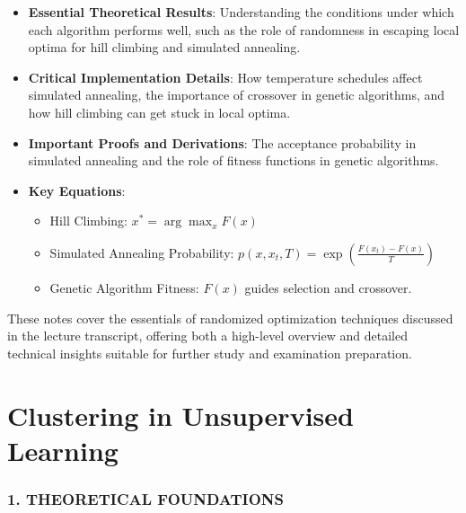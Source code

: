 \documentclass[
  12pt,
]{report}
\providecommand{\tightlist}{%
  \setlength{\itemsep}{0pt}\setlength{\parskip}{0pt}}
\begin{document}
\begin{enumerate}
  \begin{itemize}
  \tightlist
  \item
    \textbf{Essential Theoretical Results}: Understanding the conditions under which each algorithm performs well, such as the role of randomness in escaping local optima for hill climbing and simulated annealing.
  \item
    \textbf{Critical Implementation Details}: How temperature schedules affect simulated annealing, the importance of crossover in genetic algorithms, and how hill climbing can get stuck in local optima.
  \item
    \textbf{Important Proofs and Derivations}: The acceptance probability in simulated annealing and the role of fitness functions in genetic algorithms.
  \item
    \textbf{Key Equations}:

    \begin{itemize}
    \tightlist
    \item
      Hill Climbing: \(x^* = \arg\max_{x} F(x)\)
    \item
      Simulated Annealing Probability: \(p(x, x_t, T) = \exp\left(\frac{F(x_t) - F(x)}{T}\right)\)
    \item
      Genetic Algorithm Fitness: \(F(x)\) guides selection and crossover.
    \end{itemize}
  \end{itemize}
\end{enumerate}

These notes cover the essentials of randomized optimization techniques discussed in the lecture transcript, offering both a high-level overview and detailed technical insights suitable for further study and examination preparation.

\chapter{Clustering in Unsupervised Learning}

\subsection{1. THEORETICAL FOUNDATIONS}\label{theoretical-foundations-1}
\end{document}
